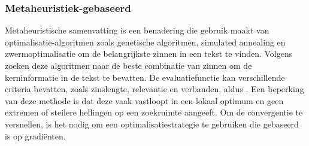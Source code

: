 

\subsubsection{Metaheuristiek-gebaseerd}

Metaheuristische samenvatting is een benadering die gebruik maakt van optimalisatie-algoritmen zoals genetische algoritmen, simulated annealing en zwermoptimalisatie om de belangrijkste zinnen in een tekst te vinden. Volgens \textcite{Premjith2015, Verma2020} zoeken deze algoritmen naar de beste combinatie van zinnen om de kerninformatie in de tekst te bevatten. De evaluatiefunctie kan verschillende criteria bevatten, zoals zinslengte, relevantie en verbanden, aldus \textcite{Rani2021}. Een beperking van deze methode is dat deze vaak vastloopt in een lokaal optimum en geen extremen of steilere hellingen op een zoekruimte aangeeft. Om de convergentie te versnellen, is het nodig om een optimalisatiestrategie te gebruiken die gebaseerd is op gradiënten.


